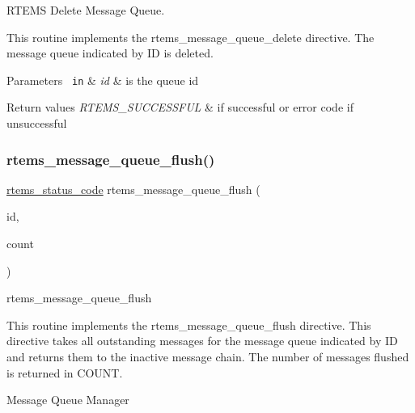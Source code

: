 R\+T\+E\+MS Delete Message Queue. 

This routine implements the rtems\+\_\+message\+\_\+queue\+\_\+delete directive. The message queue indicated by ID is deleted.


\begin{DoxyParams}[1]{Parameters}
\mbox{\texttt{ in}}  & {\em id} & is the queue id\\
\hline
\end{DoxyParams}

\begin{DoxyRetVals}{Return values}
{\em R\+T\+E\+M\+S\+\_\+\+S\+U\+C\+C\+E\+S\+S\+F\+UL} & if successful or error code if unsuccessful \\
\hline
\end{DoxyRetVals}
\mbox{\label{group__ClassicMessageQueue_ga8b97ede3b5602d6f5cca6229f96f27ee}} 
\subsubsection{\texorpdfstring{rtems\_message\_queue\_flush()}{rtems\_message\_queue\_flush()}}
{\footnotesize\ttfamily \mbox{\hyperlink{group__ClassicStatus_ga545d41846817eaba6143d52ee4d9e9fe}{rtems\+\_\+status\+\_\+code}} rtems\+\_\+message\+\_\+queue\+\_\+flush (\begin{DoxyParamCaption}\item[{\mbox{\hyperlink{group__ClassicTasks_gab20892b814dced7dd4e5b9bf42becd57}{rtems\+\_\+id}}}]{id,  }\item[{uint32\+\_\+t $\ast$}]{count }\end{DoxyParamCaption})}



rtems\+\_\+message\+\_\+queue\+\_\+flush 

This routine implements the rtems\+\_\+message\+\_\+queue\+\_\+flush directive. This directive takes all outstanding messages for the message queue indicated by ID and returns them to the inactive message chain. The number of messages flushed is returned in C\+O\+U\+NT.

Message Queue Manager \mbox{\label{group__ClassicMessageQueue_gacee875342933dcff59f9ed66232cdce8}} 
